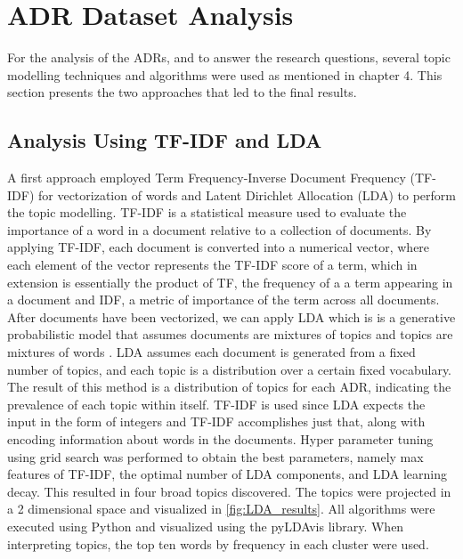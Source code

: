 \chapter{ADR Dataset Analysis}
    For the analysis of the ADRs, and to answer the research questions, several topic modelling techniques and algorithms were used as mentioned in chapter 4. This section presents the two approaches that led to the final results.
        
    \section{Analysis Using TF-IDF and LDA}
        A first approach employed Term Frequency-Inverse Document Frequency (TF-IDF) for vectorization of words and Latent Dirichlet Allocation (LDA) to perform the topic modelling. TF-IDF is a statistical measure used to evaluate the importance of a word in a document relative to a collection of documents. By applying TF-IDF, each document is converted into a numerical vector, where each element of the vector represents the TF-IDF score of a term, which in extension is essentially the product of TF, the frequency of a a term appearing in a document and IDF, a metric of importance of the term across all documents. After documents have been vectorized, we can apply LDA which is is a generative probabilistic model that assumes documents are mixtures of topics and topics are mixtures of words \cite{LDA_paper}. LDA assumes each document is generated from a fixed number of topics, and each topic is a distribution over a certain fixed vocabulary. The result of this method is a distribution of topics for each ADR, indicating the prevalence of each topic within itself. TF-IDF is used since LDA expects the input in the form of integers and TF-IDF accomplishes just that, along with encoding information about words in the documents. Hyper parameter tuning using grid search was performed to obtain the best parameters, namely max features of TF-IDF, the optimal number of LDA components, and LDA learning decay. This resulted in four broad topics discovered. The topics were projected in a 2 dimensional space and visualized in \ref{fig:LDA_results}. All algorithms were executed using Python and visualized using the pyLDAvis library. When interpreting topics, the top ten words by frequency in each cluster were used.

